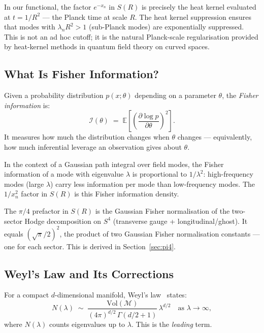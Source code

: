 \documentclass[12pt,a4paper]{article}
\begin{document}
In our functional, the factor $e^{-x_n}$ in
$S(R)$ is precisely the heat kernel evaluated at
$t = 1/R^2$ --- the Planck time at scale $R$.
The heat kernel suppression ensures that modes with
$\lambda_n R^2 > 1$ (sub-Planck modes) are
exponentially suppressed.
This is not an ad hoc cutoff; it is the natural
Planck-scale regularisation provided by heat-kernel
methods in quantum field theory on curved spaces.

\subsection{What Is Fisher Information?}

Given a probability distribution $p(x;\theta)$
depending on a parameter $\theta$,
the \emph{Fisher information} is:
\begin{equation}
  \mathcal{I}(\theta)
  \;=\;
  \mathbb{E}\!\left[\left(\frac{\partial \log p}{\partial\theta}\right)^2\right].
\end{equation}
It measures how much the distribution changes
when $\theta$ changes --- equivalently,
how much inferential leverage an observation gives
about $\theta$.

In the context of a Gaussian path integral over
field modes, the Fisher information of a mode
with eigenvalue $\lambda$ is proportional to $1/\lambda^2$:
high-frequency modes (large $\lambda$) carry less
information per mode than low-frequency modes.
The $1/x_n^2$ factor in $S(R)$ is this Fisher
information density.

The $\pi/4$ prefactor in $S(R)$ is the Gaussian
Fisher normalisation of the two-sector Hodge decomposition
on $S^4$ (transverse gauge + longitudinal/ghost).
It equals $(\sqrt{\pi}/2)^2$, the product of two
Gaussian Fisher normalisation constants --- one
for each sector. This is derived in Section~\ref{sec:pi4}.

\subsection{Weyl's Law and Its Corrections}
\label{sec:weyl_intro}

For a compact $d$-dimensional manifold,
Weyl's law~\cite{Weyl} states:
\begin{equation}
  N(\lambda) \;\sim\;
  \frac{\mathrm{Vol}(\mathcal{M})}{(4\pi)^{d/2}\,\Gamma(d/2+1)}\,\lambda^{d/2}
  \quad\text{as }\lambda\to\infty,
\end{equation}
where $N(\lambda)$ counts eigenvalues up to $\lambda$.
This is the \emph{leading} term.
\end{document}

